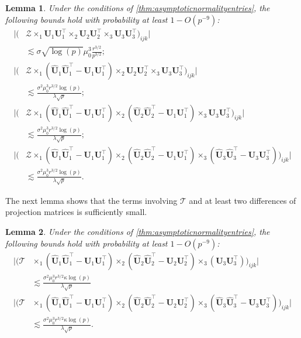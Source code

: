 \documentclass[10pt]{article}
\newcommand{\0}{{\mathbf{0}}}
\newcommand{\1}{{\mathbf{1}}}
\newcommand{\U}{{\mathbf{U}}}
\renewcommand{\t}{^{\top}}
\newcommand{\uhat}{\mathbf{\hat{U}}}
\newtheorem{lemma}{Lemma}
\renewcommand{\hat}{\widehat}
\renewcommand{\hat}{\widehat}
\begin{document}
 \begin{lemma} \label{lem:zentrywiselemma}
 Under the conditions of \cref{thm:asymptoticnormalityentries},
 the following bounds hold with probability at least $1 - O(p^{-9})$:
 \begin{align*}
    \bigg| \bigg( &\mathcal{Z} \times_1 \U_1 \U_1\t \times_2 \U_2 \U_2\t \times_3 \U_3 \U_3\t \bigg)_{ijk} \bigg| \\
    &\lesssim \sigma\sqrt{\log(p)} \mu_0^3 \frac{r^{3/2}}{p^{3/2}}; \\
    \bigg| \bigg( &\mathcal{Z} \times_1 (\uhat_1 \uhat_1\t - \U_1 \U_1\t) \times_2 \U_2 \U_2\t \times_3 \U_3 \U_3\t \bigg)_{ijk} \bigg|\\ &\lesssim \frac{\sigma^2 \mu_0^3 r^{3/2} \log(p)}{\lambda \sqrt{p}}; \\
     \bigg| \bigg(& \mathcal{Z} \times_1 (\uhat_1 \uhat_1\t - \U_1 \U_1\t) \times_2 (\uhat_2 \uhat_2\t - \U_1 \U_1\t) \times_3 \U_3 \U_3\t \bigg)_{ijk} \bigg|\\
     &\lesssim  \frac{\sigma^2 \mu_0^3 r^{3/2} \log(p)}{\lambda \sqrt{p}}; \\
     \bigg| \bigg(& \mathcal{Z} \times_1 (\uhat_1 \uhat_1\t - \U_1 \U_1\t) \times_2 (\uhat_2 \uhat_2\t - \U_1 \U_1\t) \times_3 (\uhat_3 \uhat_3\t - \U_3 \U_3\t) \bigg)_{ijk} \bigg| \\&\lesssim  \frac{\sigma^2 \mu_0^3 r^{3/2} \log(p)}{\lambda \sqrt{p}}.
\end{align*}
\end{lemma}
\noindent 
The next lemma shows that the terms involving $\mathcal{T}$ and at least two differences of projection matrices is sufficiently small.

\begin{lemma}\label{lem:tentrywiselemma}
Under the conditions of \cref{thm:asymptoticnormalityentries}, the following bounds hold with probability at least $1 - O(p^{-9})$:
\begin{align*}
  \bigg| \bigg( \mathcal{T}& \times_1 (\uhat_1 \uhat_1\t - \U_1\U_1\t) \times_2 ( \uhat_2 \uhat_2\t - \U_2 \U_2\t) \times_3 (\U_3 \U_3\t) \bigg)_{ijk}  \bigg|\\&\lesssim \frac{\sigma^2 \mu_0^3 r^{3/2} \kappa \log(p)}{\lambda\sqrt{p}}  \\
  \bigg| \bigg( \mathcal{T}& \times_1 (\uhat_1 \uhat_1\t - \U_1\U_1\t) \times_2 ( \uhat_2 \uhat_2\t - \U_2 \U_2\t) \times_3 (\uhat_3 \uhat_3\t - \U_3 \U_3\t) \bigg)_{ijk} \bigg| \\&\lesssim \frac{\sigma^2 \mu_0^3 r^{3/2} \kappa \log(p)}{\lambda\sqrt{p}}.
\end{align*}
\end{lemma}
\end{document}
